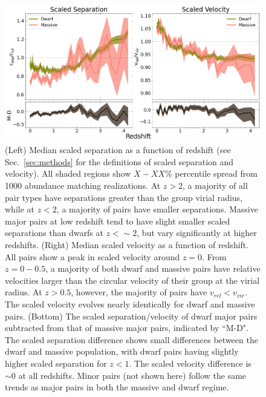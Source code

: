 \documentclass[twocolumn]{aastex631}
\begin{document}
\begin{figure}[htp]
  \centering
  \includegraphics[width=\textwidth]{scaledcombo_1000.png}
  \caption{ \label{fig:scaled}
      (Left) Median scaled separation as a function of redshift (see Sec.~\ref{sec:methods} for the definitions of scaled separation and velocity). All shaded regions show $X-XX\%$ percentile spread from 1000 abundance matching realizations. 
      At $z>2$, a majority of all pair types have separations greater than the group virial radius, while at $z<2$, a majority of pairs have smaller separations.  
      Massive major pairs at low redshift tend to have slight smaller scaled separations than dwarfs at $z<\sim2$, but vary significantly at higher redshifts. 
      (Right) Median scaled velocity as a function of redshift.
      All pairs show a peak in scaled velocity around $z=0$. From $z=0-0.5$, a majority of both dwarf and massive pairs have relative velocities larger than the circular velocity of their group at the virial radius. At $z>0.5$, however, the majority of pairs have $v_{rel}<v_{vir}$. The scaled velocity evolves nearly identically for dwarf and massive pairs.
      (Bottom) The scaled separation/velocity of dwarf major pairs subtracted from that of massive major pairs, indicated by ``M-D".
      The scaled separation difference shows small differences between the dwarf and massive population, with dwarf pairs having slightly higher scaled separation for $z<1$. The scaled velocity difference is $\sim0$ at all redshifts.
      Minor pairs (not shown here) follow the same trends as major pairs in both the massive and dwarf regime.}
\end{figure}
\end{document}
